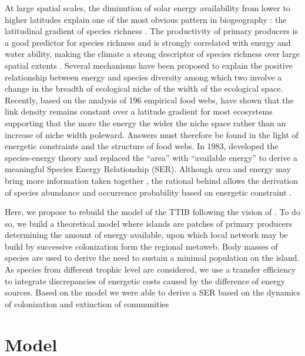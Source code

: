 At large spatial scales, the diminution of solar energy availability
from lower to higher latitudes explain one of the most obvious pattern
in biogeography : the latitudinal gradient of species richness
\citep{Rhode1992, Stevens1989, Evans2005}. The productivity of primary
producers is a good predictor for species richness
\citep{Evans2005, Storch2005} and is strongly correlated with energy and
water ability, making the climate a strong descriptor of species
richness over large spatial extents \citep{Hawkins2003}. Several
mechanisms have been proposed to explain the positive relationship
between energy and species diversity \citep[see][ for a
review]{Evans2005} among which two involve a change in the breadth of
ecological niche of the width of the ecological space. Recently, based
on the analysis of 196 empirical food webs, \citet{Cirtwill2015a} have
shown that the link density remains constant over a latitude gradient
for most ecosystems supporting that the more the energy the wider the
niche space rather than an increase of niche width poleward. Answers
must therefore be found in the light of energetic constraints and the
structure of food webs. In 1983, \citet{Wright1983} developed the
species-energy theory and replaced the ``area'' with ``available
energy'' to derive a meaningful Species Energy Relationship (SER).
Although area and energy may bring more information taken together
\citep{Storch2005}, the rational behind allows the derivation of species
abundance and occurrence probability based on energetic constraint
\citep{Wright1983}.

Here, we propose to rebuild the model of the TTIB following the vision
of \citet{Wright1983}. To do so, we build a theoretical model where
islands are patches of primary producers determining the amount of
energy available, upon which local network may be build by successive
colonization form the regional metaweb. Body masses of species are used
to derive the need to sustain a minimal population on the island. As
species from different trophic level are considered, we use a transfer
efficiency to integrate discrepancies of energetic costs caused by the
difference of energy sources. Based on the model we were able to derive
a SER based on the dynamics of colonization and extinction of
communities

\section{Model}\label{model}

